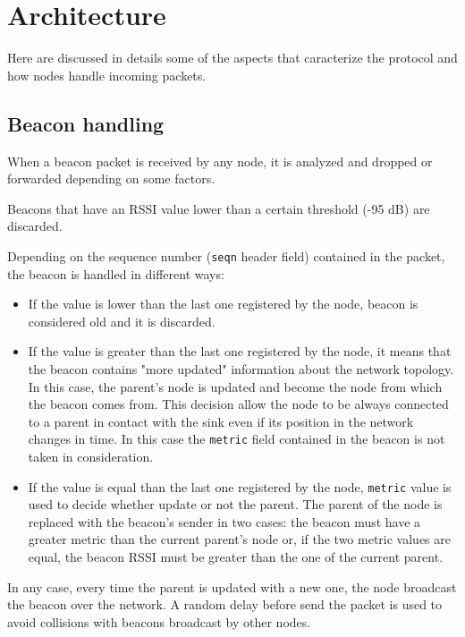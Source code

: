 \section{Architecture}
\label{sec:architecture}

Here are discussed in details some of the aspects that caracterize the protocol and how nodes handle incoming packets.

\subsection{Beacon handling}

When a beacon packet is received by any node, it is analyzed and dropped or forwarded depending on some factors.

Beacons that have an RSSI value lower than a certain threshold (-95 dB) are discarded.

Depending on the sequence number (\texttt{seqn} header field) contained in the packet, the beacon is handled in different ways:

\begin{itemize}

\item If the value is lower than the last one registered by the node, beacon is considered old and it is discarded.

\item If the value is greater than the last one registered by the node, it means that the beacon contains "more updated" information about the network topology. In this case, the parent's node is updated and become the node from which the beacon comes from. This decision allow the node to be always connected to a parent in contact with the sink even if its position in the network changes in time. In this case the \texttt{metric} field contained in the beacon is not taken in consideration.

\item If the value is equal than the last one registered by the node, \texttt{metric} value is used to decide whether update or not the parent. The parent of the node is replaced with the beacon's sender in two cases: the beacon must have a greater metric than the current parent's node or, if the two metric values are equal, the beacon RSSI must be greater than the one of the current parent.

\end{itemize}

In any case, every time the parent is updated with a new one, the node broadcast the beacon over the network. A random delay before send the packet is used to avoid collisions with beacons broadcast by other nodes.


